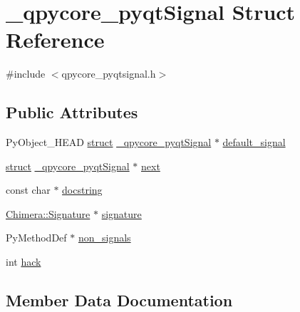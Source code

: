 \hypertarget{struct__qpycore__pyqtSignal}{}\section{\+\_\+qpycore\+\_\+pyqt\+Signal Struct Reference}
\label{struct__qpycore__pyqtSignal}


{\ttfamily \#include $<$qpycore\+\_\+pyqtsignal.\+h$>$}

\subsection*{Public Attributes}
\begin{DoxyCompactItemize}
\item 
Py\+Object\+\_\+\+H\+E\+A\+D \hyperlink{gen__mat5files_8m_aa5a86657308844fba3fe81ef5286ca5f}{struct} \hyperlink{struct__qpycore__pyqtSignal}{\+\_\+qpycore\+\_\+pyqt\+Signal} $\ast$ \hyperlink{struct__qpycore__pyqtSignal_ae86f67cce71cfb9414b07eff70f13ee6}{default\+\_\+signal}
\item 
\hyperlink{gen__mat5files_8m_aa5a86657308844fba3fe81ef5286ca5f}{struct} \hyperlink{struct__qpycore__pyqtSignal}{\+\_\+qpycore\+\_\+pyqt\+Signal} $\ast$ \hyperlink{struct__qpycore__pyqtSignal_ad4c1f31b1d175855ce7ae3412f427d1b}{next}
\item 
const char $\ast$ \hyperlink{struct__qpycore__pyqtSignal_a6e0960aeaae4cf222a1a7756ca6dd240}{docstring}
\item 
\hyperlink{classChimera_1_1Signature}{Chimera\+::\+Signature} $\ast$ \hyperlink{struct__qpycore__pyqtSignal_a9e4afc58539fccafe55e9f272612a6e8}{signature}
\item 
Py\+Method\+Def $\ast$ \hyperlink{struct__qpycore__pyqtSignal_a8e7dc45a4357293048236ceeda4a1cd6}{non\+\_\+signals}
\item 
int \hyperlink{struct__qpycore__pyqtSignal_a5523790f68757efc289c0f474a8ec3b7}{hack}
\end{DoxyCompactItemize}


\subsection{Member Data Documentation}
\hypertarget{struct__qpycore__pyqtSignal_ae86f67cce71cfb9414b07eff70f13ee6}{}
